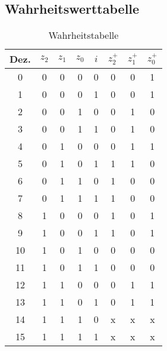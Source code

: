 \subsection{Wahrheitswerttabelle}
\begin{table}[H]
    \centering
    \def\arraystretch{1.3}
    \begin{tabular}{|c!{\vrule width 1.5pt}c|c|c|c!{\vrule width 1.5pt}c|c|c|}
        \hline
        Dez. & $z_2$ & $z_1$ & $z_0$ & $i$ & $z_2^+$ & $z_1^+$ & $z_0^+$ \\
            & 0     & 0     & 0     & 0   & 0       & 0       & 1       \\
        1    & 0     & 0     & 0     & 1   & 0       & 0       & 1       \\
        2    & 0     & 0     & 1     & 0   & 0       & 1       & 0       \\
        3    & 0     & 0     & 1     & 1   & 0       & 1       & 0       \\
        4    & 0     & 1     & 0     & 0   & 0       & 1       & 1       \\
        5    & 0     & 1     & 0     & 1   & 1       & 1       & 0       \\
        6    & 0     & 1     & 1     & 0   & 1       & 0       & 0       \\
        7    & 0     & 1     & 1     & 1   & 1       & 0       & 0       \\
        8    & 1     & 0     & 0     & 0   & 1       & 0       & 1       \\
        9    & 1     & 0     & 0     & 1   & 1       & 0       & 1       \\
        10   & 1     & 0     & 1     & 0   & 0       & 0       & 0       \\
        11   & 1     & 0     & 1     & 1   & 0       & 0       & 0       \\
        12   & 1     & 1     & 0     & 0   & 0       & 1       & 1       \\
        13   & 1     & 1     & 0     & 1   & 0       & 1       & 1       \\
        14   & 1     & 1     & 1     & 0   & x       & x       & x       \\
        15   & 1     & 1     & 1     & 1   & x       & x       & x       \\
        \hline
    \end{tabular}
    \caption{Wahrheitstabelle}
    \label{tab:wahrheitstabelle}
\end{table}


